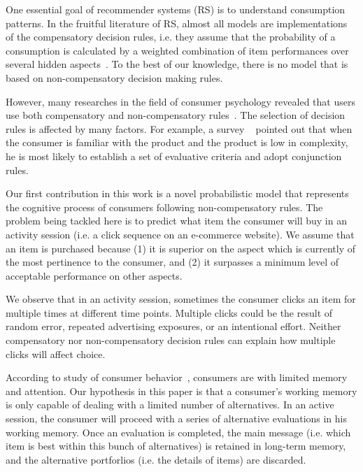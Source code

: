 \documentclass[sigconf]{acmart}
\begin{document}
One essential goal of recommender systems (RS) is to understand consumption patterns. In the fruitful literature of RS, almost all models are implementations of the compensatory decision rules, i.e. they assume that the probability of a consumption is calculated by a weighted combination of item performances over several hidden aspects~\cite{Hu2008Collaborative,Gopalan2015Scalable}. To the best of our knowledge, there is no model that is based on non-compensatory decision making rules.


However, many researches in the field of consumer psychology revealed that users use both compensatory and non-compensatory rules~\cite{Engel1986Consumer}. The selection of decision rules is affected by many factors. For example, a survey ~\cite{Park1976Effect} pointed out that when the consumer is familiar with the product and the product is low in complexity, he is most likely to establish a set of evaluative criteria and adopt conjunction rules.




Our first contribution in this work is a novel probabilistic model that represents the cognitive process of consumers following non-compensatory rules. The problem being tackled here is to predict what item the consumer will buy in an activity session (i.e. a click sequence on an e-commerce website). We assume that an item is purchased because (1) it is superior on the aspect which is currently of the most pertinence to the consumer, and (2) it surpasses a minimum level of acceptable performance on other aspects.


We observe that in an activity session, sometimes the consumer clicks an item for multiple times at different time points. Multiple clicks could be the result of random error, repeated advertising exposures, or an intentional effort. Neither compensatory nor non-compensatory decision rules can explain how multiple clicks will affect choice.


According to study of consumer behavior~\cite{Engel1986Consumer}, consumers are with limited memory and attention. Our hypothesis in this paper is that a consumer's working memory is only capable of dealing with a limited number of alternatives. In an active session, the consumer will proceed with a series of alternative evaluations in his working memory. Once an evaluation is completed, the main message (i.e. which item is best within this bunch of alternatives) is retained in long-term memory, and the alternative portforlios (i.e. the details of items) are discarded.
\end{document}
